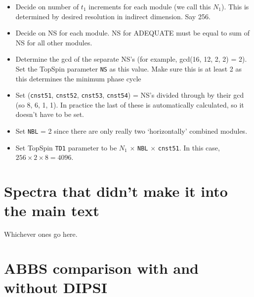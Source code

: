 \documentclass[a4paper,12pt]{article}
\begin{document}
\begin{refsection}
\begin{itemize}
    \item Decide on number of $t_1$ increments for each module (we call this $N_1$). This is determined by desired resolution in indirect dimension. Say 256.
    \item Decide on NS for each module. NS for ADEQUATE must be equal to sum of NS for all other modules.
    \item Determine the gcd of the separate NS's (for example, gcd(16, 12, 2, 2) = 2). Set the TopSpin parameter \texttt{NS} as this value. Make sure this is at least 2 as this determines the minimum phase cycle
    \item Set (\texttt{cnst51}, \texttt{cnst52}, \texttt{cnst53}, \texttt{cnst54}) = NS's divided through by their gcd (so 8, 6, 1, 1). In practice the last of these is automatically calculated, so it doesn't have to be set.
    \item Set \texttt{NBL} = 2 since there are only really two `horizontally' combined modules.
    \item Set TopSpin \texttt{TD1} parameter to be $N_1$ $\times$ \texttt{NBL} $\times$ \texttt{cnst51}. In this case, $256 \times 2 \times 8 = 4096$.
\end{itemize}

\section{Spectra that didn't make it into the main text}

Whichever ones go here.

\clearpage

\section{ABBS comparison with and without DIPSI}


\end{refsection}
\end{document}

